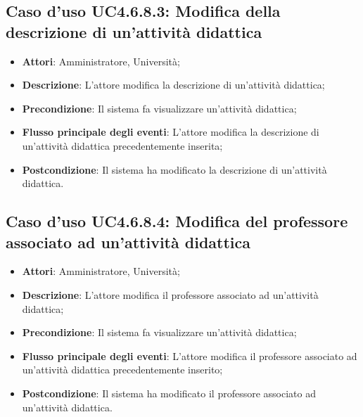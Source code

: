 \subsection{Caso d'uso \texorpdfstring{UC4.6.8.3}{UC4.6.8.3}: Modifica della descrizione di un'attività didattica}
\begin{itemize}
\item \textbf{Attori}: Amministratore, Università;
\item \textbf{Descrizione}: L'attore modifica la descrizione di un'attività didattica;

\item \textbf{Precondizione}: Il sistema fa visualizzare un'attività didattica;


\item \textbf{Flusso principale degli eventi}: L'attore modifica la descrizione di un'attività didattica precedentemente inserita;

\item \textbf{Postcondizione}: Il sistema ha modificato la descrizione di un'attività didattica.

\end{itemize}
\subsection{Caso d'uso \texorpdfstring{UC4.6.8.4}{UC4.6.8.4}: Modifica del professore associato ad un'attività didattica}
\begin{itemize}
\item \textbf{Attori}: Amministratore, Università;
\item \textbf{Descrizione}: L'attore modifica il professore associato ad un'attività didattica;

\item \textbf{Precondizione}: Il sistema fa visualizzare un'attività didattica;


\item \textbf{Flusso principale degli eventi}: L'attore modifica il professore associato ad un'attività didattica precedentemente inserito;

\item \textbf{Postcondizione}: Il sistema ha modificato il professore associato ad un'attività didattica.

\end{itemize}
